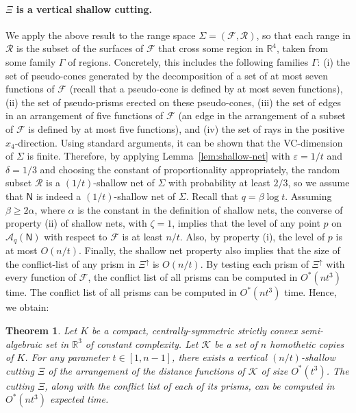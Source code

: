 \documentclass[11pt]{article}
\def\reals{{\mathbb R}}
\def\eps{{\varepsilon}}
\def\A{\mathcal{A}}
\def\F{\mathcal{F}}
\def\K{\mathcal{K}}
\def\R{\mathcal{R}}
\def\NN{\mathsf{N}}
\newtheorem{theorem}{Theorem}[section]
\theoremstyle{definition}
\begin{document}
\paragraph{$\Xi$ is a vertical shallow cutting.}
\fi
We apply the above result to the range space $\Sigma=(\F, \R)$, %
so that each range in $\R$ is the subset of the surfaces of $\F$ that cross some region in $\reals^4$,
taken from some family $\Gamma$ of regions. Concretely, this includes the following families $\Gamma$:
(i) the set of pseudo-cones generated by the decomposition of a set of at most seven functions of $\F$ (recall that a pseudo-cone is defined by at most seven functions), 
(ii) the set of pseudo-prisms erected on these pseudo-cones, (iii) the set of edges in an arrangement 
of five functions of $\F$ (an edge in the arrangement of a subset of $\F$ 
is defined by at most five functions),
and (iv) the set of rays in the positive $x_4$-direction.
Using standard arguments, it can be shown that the VC-dimension of $\Sigma$ is finite. Therefore, by 
applying Lemma~\ref{lem:shallow-net} with $\eps=1/t$ and $\delta=1/3$ and choosing the constant of proportionality appropriately,
the random subset $\R$ is a $(1/t)$-shallow net of $\Sigma$ with probability at least $2/3$,
so we assume that $\NN$ is indeed a $(1/t)$-shallow net of $\Sigma$.
Recall that $q=\beta\log t$. Assuming $\beta\ge 2\alpha$, where $\alpha$ is the constant in the definition of shallow nets,
the converse of property (ii) of shallow nets, with $\zeta=1$, implies 
that the level of any point 
$p$ on $\A_q(\NN)$ with respect to $\F$ is  at least $n/t$.
Also, by property (i), the level of $p$  is at most $O(n/t)$. 
Finally, the shallow net property also implies that the size of the 
conflict-list of any prism in $\Xi^\uparrow$ is $O(n/t)$.
\iffullver
By testing each prism of $\Xi^\uparrow$ with every function of $\F$, 
the conflict list of all prisms can be computed in $O^*(nt^3)$ time.
\else
The conflict list of all prisms can be computed in $O^*(nt^3)$ time.
\fi
Hence, we obtain:

\begin{theorem}
	\label{thm:cutting}
Let $K$ be a compact, centrally-symmetric strictly convex semi-algebraic set
in $\reals^3$ of constant complexity.  Let $\K$ be a set of $n$ homothetic 
copies of $K$. For any parameter $t \in [1,n-1]$, there exists a vertical 
$(n/t)$-shallow cutting $\Xi$ of the arrangement of the distance functions of $\K$ of size $O^*(t^3)$.
The cutting $\Xi$, along with the conflict list of each of its prisms, can be computed in $O^*(nt^3)$ expected time.
\end{theorem}
\end{document}
